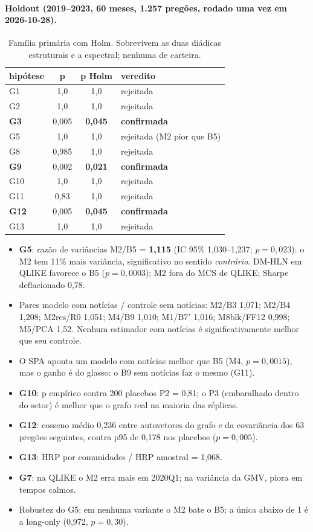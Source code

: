 \documentclass[11pt,a4paper]{article}
\begin{document}
\paragraph{Holdout (2019--2023, 60 meses, 1.257 pregões, rodado uma vez em 2026-10-28).}

\begin{table}[h]
\centering\small
\begin{tabular}{lccl}
\toprule
hipótese & p & p Holm & veredito \\
\midrule
G1 & 1,0 & 1,0 & rejeitada \\
G2 & 1,0 & 1,0 & rejeitada \\
\textbf{G3} & 0,005 & \textbf{0,045} & \textbf{confirmada} \\
G5 & 1,0 & 1,0 & rejeitada (M2 pior que B5) \\
G8 & 0,985 & 1,0 & rejeitada \\
\textbf{G9} & 0,002 & \textbf{0,021} & \textbf{confirmada} \\
G10 & 1,0 & 1,0 & rejeitada \\
G11 & 0,83 & 1,0 & rejeitada \\
\textbf{G12} & 0,005 & \textbf{0,045} & \textbf{confirmada} \\
G13 & 1,0 & 1,0 & rejeitada \\
\bottomrule
\end{tabular}
\caption{Família primária com Holm. Sobrevivem as duas diádicas estruturais e a espectral; nenhuma de carteira.}
\end{table}

\begin{itemize}
  \item \textbf{G5}: razão de variâncias M2/B5 = \textbf{1,115} (IC 95\% 1,030--1,237; $p=0{,}023$): o M2 tem 11\% mais
        variância, significativo no sentido \emph{contrário}. DM-HLN em QLIKE favorece o B5 ($p=0{,}0003$);
        M2 fora do MCS de QLIKE; Sharpe deflacionado 0,78.
  \item Pares modelo com notícias / controle sem notícias: M2/B3 1,071; M2/B4 1,208; M2res/R0 1,051;
        M4/B9 1,010; M1/B7$'$ 1,016; M8blk/FF12 0,998; M5/PCA 1,52. Nenhum estimador com notícias é
        significativamente melhor que seu controle.
  \item O SPA aponta um modelo com notícias melhor que B5 (M4, $p=0{,}0015$), mas o ganho é do glasso: o B9
        sem notícias faz o mesmo (G11).
  \item \textbf{G10}: p empírico contra 200 placebos P2 = 0,81; o P3 (embaralhado dentro do setor) é melhor que
        o grafo real na maioria das réplicas.
  \item \textbf{G12}: cosseno médio 0,236 entre autovetores do grafo e da covariância dos 63 pregões seguintes,
        contra p95 de 0,178 nos placebos ($p=0{,}005$).
  \item \textbf{G13}: HRP por comunidades / HRP amostral = 1,068.
  \item \textbf{G7}: na QLIKE o M2 erra mais em 2020Q1; na variância da GMV, piora em tempos calmos.
  \item Robustez do G5: em nenhuma variante o M2 bate o B5; a única abaixo de 1 é a long-only (0,972, $p=0{,}30$).
\end{itemize}
\end{document}
